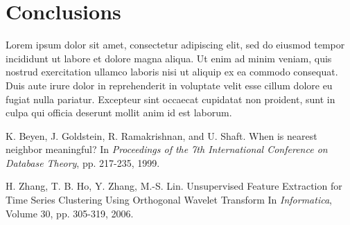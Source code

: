 \documentclass{article}
\begin{document}
\section{Conclusions}
Lorem ipsum dolor sit amet, consectetur adipiscing elit, sed do eiusmod tempor incididunt ut labore et dolore magna aliqua. Ut enim ad minim veniam, quis nostrud exercitation ullamco laboris nisi ut aliquip ex ea commodo consequat. Duis aute irure dolor in reprehenderit in voluptate velit esse cillum dolore eu fugiat nulla pariatur. Excepteur sint occaecat cupidatat non proident, sunt in culpa qui officia deserunt mollit anim id est laborum.


  \begin{thebibliography}{1}

 K. Beyen, J. Goldstein, R. Ramakrishnan, and U. Shaft. When is nearest neighbor meaningful? In {\em Proceedings of the 7th International Conference on Database Theory}, pp. 217-235, 1999.

 H. Zhang, T. B. Ho, Y. Zhang, M.-S. Lin. Unsupervised Feature Extraction for Time Series Clustering Using Orthogonal Wavelet Transform In {\em Informatica}, Volume 30, pp. 305-319, 2006.

\end{thebibliography}
\end{document}
